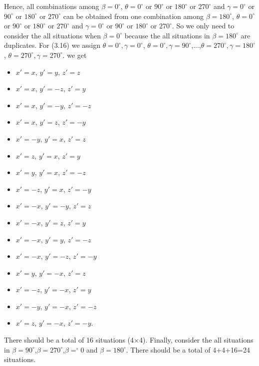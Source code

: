 Hence, all combinations among $\beta=0^{\circ}$, $\theta=0^{\circ}$ or $90^{\circ}$ or $180^{\circ}$ or $270^{\circ}$ and $\gamma=0^{\circ}$ or $90^{\circ}$ or $180^{\circ}$ or $270^{\circ}$ can be obtained from one combination among $\beta=180^{\circ}$, $\theta=0^{\circ}$ or $90^{\circ}$ or $180^{\circ}$ or $270^{\circ}$ and $\gamma=0^{\circ}$ or $90^{\circ}$ or $180^{\circ}$ or $270^{\circ}$. So we only need to consider the all situations when $\beta=0^{\circ}$ because the all situations in $\beta=180^{\circ}$ are duplicates. For (3.16) we assign $\theta=0^{\circ},\gamma=0^{\circ}$, $\theta=0^{\circ},\gamma=90^{\circ}$,...,$\theta=270^{\circ},\gamma=180^{\circ}$, $\theta=270^{\circ},\gamma=270^{\circ}$. we get
\begin{itemize}
  \item  $x'=x$, $y'=y$, $z'=z$  
  \item  $x'=x$, $y'=-z$, $z'=y$ 
  \item  $x'=x$, $y'=-y$, $z'=-z$ 
  \item  $x'=x$, $y'=z$, $z'=-y$
  \item  $x'=-y$, $y'=x$, $z'=z$
  \item  $x'=z$, $y'=x$, $z'=y$
  \item  $x'=y$, $y'=x$, $z'=-z$
  \item  $x'=-z$, $y'=x$, $z'=-y$
  \item  $x'=-x$, $y'=-y$, $z'=z$
  \item  $x'=-x$, $y'=z$, $z'=y$
  \item  $x'=-x$, $y'=y$, $z'=-z$
  \item  $x'=-x$, $y'=-z$, $z'=-y$
  \item  $x'=y$, $y'=-x$, $z'=z$
  \item  $x'=-z$, $y'=-x$, $z'=y$
  \item  $x'=-y$, $y'=-x$, $z'=-z$
  \item  $x'=z$, $y'=-x$, $z'=-y$.
  \label{3Drotation24situations3}
\end{itemize}
There should be a total of 16 situations (4$\times$4). Finally, consider the all situations in $\beta=90^{\circ}$,$\beta=270^{\circ}$,$\beta=^{\circ}0$ and $\beta=180^{\circ}$. There should be a total of 4+4+16=24 situations.
